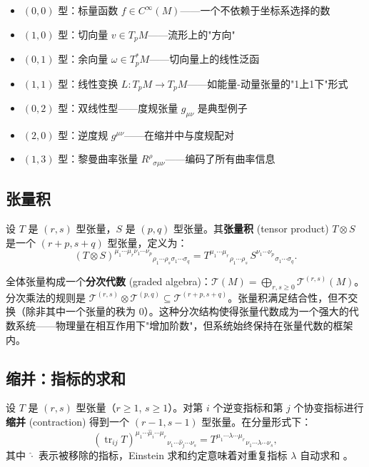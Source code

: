 \begin{itemize}
    \item $(0,0)$ 型：标量函数 $f \in C^\infty(M)$——一个不依赖于坐标系选择的数
    \item $(1,0)$ 型：切向量 $v \in T_pM$——流形上的"方向"
    \item $(0,1)$ 型：余向量 $\omega \in T_p^*M$——切向量上的线性泛函
    \item $(1,1)$ 型：线性变换 $L: T_pM \to T_pM$——如能量-动量张量的"1上1下"形式
    \item $(0,2)$ 型：双线性型——度规张量 $g_{\mu\nu}$ 是典型例子
    \item $(2,0)$ 型：逆度规 $g^{\mu\nu}$——在缩并中与度规配对
    \item $(1,3)$ 型：黎曼曲率张量 $R^\rho{}_{\sigma\mu\nu}$——编码了所有曲率信息
\end{itemize}

\subsection{张量积}

\begin{definition}[张量积]
设 $T$ 是 $(r,s)$ 型张量，$S$ 是 $(p,q)$ 型张量。其\textbf{张量积} (tensor product) $T \otimes S$ 是一个 $(r+p, s+q)$ 型张量，定义为：
\begin{equation}
    (T \otimes S)^{\mu_1\cdots\mu_r\nu_1\cdots\nu_p}{}_{\rho_1\cdots\rho_s\sigma_1\cdots\sigma_q}
    = T^{\mu_1\cdots\mu_r}{}_{\rho_1\cdots\rho_s} \, S^{\nu_1\cdots\nu_p}{}_{\sigma_1\cdots\sigma_q}.
\end{equation}
\end{definition}

\begin{remark}[张量代数的分次结构]
全体张量构成一个\textbf{分次代数} (graded algebra)：$\mathcal{T}(M) = \bigoplus_{r,s \geq 0} \mathcal{T}^{(r,s)}(M)$。分次乘法的规则是 $\mathcal{T}^{(r,s)} \otimes \mathcal{T}^{(p,q)} \subseteq \mathcal{T}^{(r+p,s+q)}$。张量积满足结合性，但不交换（除非其中一个张量的秩为 0）\cite{TensorFields2017}。这种分次结构使得张量代数成为一个强大的代数系统——物理量在相互作用下"增加阶数"，但系统始终保持在张量代数的框架内。
\end{remark}

\subsection{缩并：指标的求和}

\begin{definition}[缩并]
设 $T$ 是 $(r,s)$ 型张量（$r \geq 1$, $s \geq 1$）。对第 $i$ 个逆变指标和第 $j$ 个协变指标进行\textbf{缩并} (contraction) 得到一个 $(r-1, s-1)$ 型张量。在分量形式下：
\begin{equation}
    (\operatorname{tr}_{ij} T)^{\mu_1\cdots\hat{\mu}_i\cdots\mu_r}{}_{\nu_1\cdots\hat{\nu}_j\cdots\nu_s}
    = T^{\mu_1\cdots\lambda\cdots\mu_r}{}_{\nu_1\cdots\lambda\cdots\nu_s},
\end{equation}
其中 $\hat{\cdot}$ 表示被移除的指标，Einstein 求和约定意味着对重复指标 $\lambda$ 自动求和 \cite{Reall_Part3_GR}。
\end{definition}

